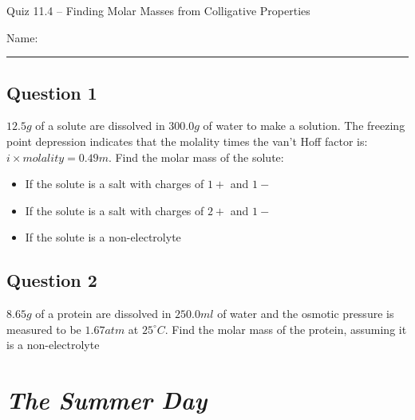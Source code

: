 \documentclass[11pt, letterpaper]{memoir}
\begin{document}
	\begin{center}
		{\large	Quiz 11.4 -- Finding Molar Masses from Colligative Properties}
	\end{center}
	{\large Name: \rule[-1mm]{4in}{.1pt} 
	
	\subsection*{Question 1}
  $12.5g$ of a solute are dissolved in $300.0g$ of water to make a solution. The freezing point depression indicates that the molality times the van't Hoff factor is: $i\times molality=0.49m$. Find the molar mass of the solute:
  \begin{itemize}
    \item If the solute is a salt with charges of $1+$ and $1-$

      \vspace{4em}
    \item If the solute is a salt with charges of $2+$ and $1-$

      \vspace{4em}
    \item If the solute is a non-electrolyte

      \vspace{4em}
  \end{itemize}

	\subsection*{Question 2}
  $8.65g$ of a protein are dissolved in $250.0ml$ of water and the osmotic pressure is measured to be $1.67atm$ at $25^\circ C$. Find the molar mass of the protein, assuming it is a non-electrolyte

	\newpage
	\pagestyle{empty}
	\addtocounter{page}{-1}
  \section*{\emph{The Summer Day}}
}
\end{document}
